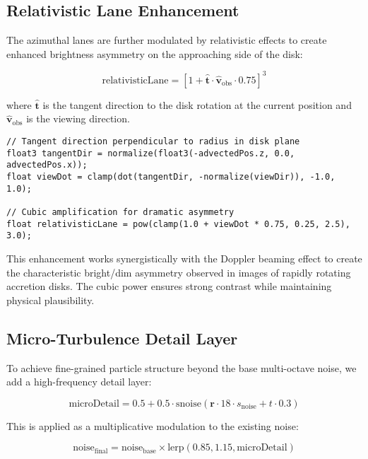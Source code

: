 \documentclass[12pt,a4paper]{article}
\theoremstyle{definition}
\theoremstyle{remark}
\begin{document}
\subsection{Relativistic Lane Enhancement}

The azimuthal lanes are further modulated by relativistic effects to create enhanced brightness asymmetry on the approaching side of the disk:

\begin{equation}
    \text{relativisticLane} = \left[1 + \hat{\mathbf{t}} \cdot \hat{\mathbf{v}}_{\text{obs}} \cdot 0.75\right]^3
\end{equation}

where $\hat{\mathbf{t}}$ is the tangent direction to the disk rotation at the current position and $\hat{\mathbf{v}}_{\text{obs}}$ is the viewing direction.

\begin{lstlisting}[style=metalstyle, caption=Relativistic lane enhancement]
// Tangent direction perpendicular to radius in disk plane
float3 tangentDir = normalize(float3(-advectedPos.z, 0.0, advectedPos.x));
float viewDot = clamp(dot(tangentDir, -normalize(viewDir)), -1.0, 1.0);

// Cubic amplification for dramatic asymmetry
float relativisticLane = pow(clamp(1.0 + viewDot * 0.75, 0.25, 2.5), 3.0);
\end{lstlisting}

This enhancement works synergistically with the Doppler beaming effect to create the characteristic bright/dim asymmetry observed in images of rapidly rotating accretion disks. The cubic power ensures strong contrast while maintaining physical plausibility.

\subsection{Micro-Turbulence Detail Layer}

To achieve fine-grained particle structure beyond the base multi-octave noise, we add a high-frequency detail layer:

\begin{equation}
    \text{microDetail} = 0.5 + 0.5 \cdot \text{snoise}(\mathbf{r} \cdot 18 \cdot s_{\text{noise}} + t \cdot 0.3)
\end{equation}

This is applied as a multiplicative modulation to the existing noise:

\begin{equation}
    \text{noise}_{\text{final}} = \text{noise}_{\text{base}} \times \text{lerp}(0.85, 1.15, \text{microDetail})
\end{equation}
\end{document}
